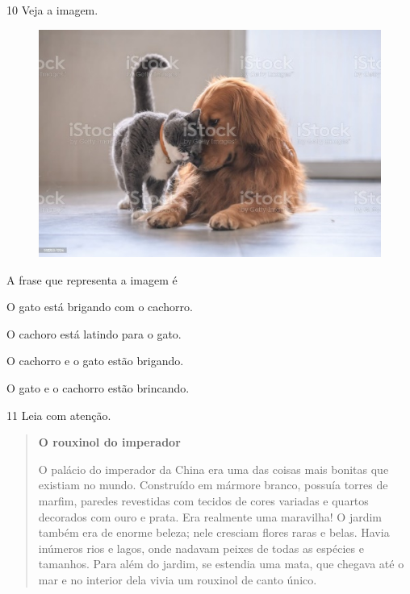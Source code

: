 

\num{10} Veja a imagem.

\begin{figure}[htpb!]
\centering
\includegraphics[width=.5\textwidth]{media/image158.jpeg}
\end{figure}


A frase que representa a imagem é

\begin{escolha}
\item O gato está brigando com o cachorro.

\item O cachoro está latindo para o gato.

\item O cachorro e o gato estão brigando.

\item O gato e o cachorro estão brincando.
\end{escolha}


\num{11} Leia com atenção.

\begin{quote}
\textbf{O rouxinol do imperador}

O palácio do imperador da China era uma das coisas mais
bonitas que existiam no mundo. Construído em mármore
branco, possuía torres de marfim, paredes revestidas com
tecidos de cores variadas e quartos decorados com ouro e
prata. Era realmente uma maravilha!
O jardim também era de enorme beleza; nele cresciam
flores raras e belas. Havia inúmeros rios e lagos, onde
nadavam peixes de todas as espécies e tamanhos.
Para além do jardim, se estendia uma mata, que
chegava até o mar e no interior dela vivia um rouxinol de
canto único.
\end{quote}

